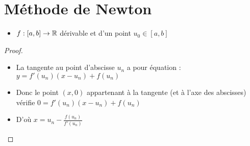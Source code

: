 \setcounter{framenumber}{0}

\section{Méthode de Newton}

\begin{frame}

\begin{itemize}
  \item $f:[a,b] \to \mathbb{R}$ dérivable et d'un point $u_0 \in[a,b]$
 
 
  
\end{itemize}



\end{frame}


\begin{frame}
\begin{minipage}{0.62\textwidth}
\end{minipage}
\pause
\begin{minipage}{0.32\textwidth}
\end{minipage}
\pause\pause\pause
\vspace*{-3ex}
\begin{proof}
\begin{itemize}[<+->]
\pause

  \item La tangente au point d'abscisse $u_n$ a pour équation :
$y = f'(u_n)(x-u_n)+f(u_n)$
  \item Donc le point $(x,0)$ appartenant à la tangente 
(et à l'axe des abscisses)
vérifie $0=f'(u_n)(x-u_n)+f(u_n)$
  \item D'où $x=u_n - \frac{f(u_n)}{f'(u_n)}$ \qedhere
\end{itemize}

\end{proof}
\end{frame}


